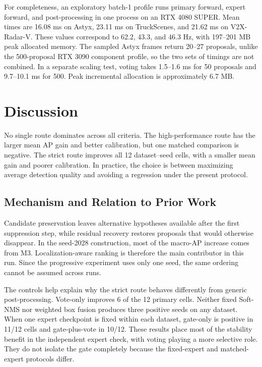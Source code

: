 \documentclass[sensors,article,submit,pdftex,moreauthors]{Definitions/mdpi}
\begin{document}
For completeness, an exploratory batch-1 profile runs primary forward, expert
forward, and post-processing in one process on an RTX 4080 SUPER. Mean times are 16.08 ms
on Astyx, 23.11 ms on TruckScenes, and 21.62 ms on V2X-Radar-V. These values
correspond to 62.2, 43.3, and 46.3 Hz, with 197--201 MB peak allocated memory.
The sampled Astyx frames return 20--27 proposals, unlike the 500-proposal
RTX 3090 component profile, so the two sets of timings are not combined. In a
separate scaling test, voting takes
1.5--1.6 ms for 50 proposals and 9.7--10.1 ms for 500. Peak incremental
allocation is approximately 6.7 MB.

\section{Discussion}

No single route dominates across all criteria. The high-performance route has
the larger mean AP gain and better calibration, but one matched comparison is
negative. The strict route improves all 12 dataset--seed cells, with a smaller
mean gain and poorer calibration. In practice, the choice is between maximizing
average detection quality and avoiding a regression under the present protocol.

\subsection{Mechanism and Relation to Prior Work}

Candidate preservation leaves alternative hypotheses available after the first
suppression step, while residual recovery restores proposals that would
otherwise disappear. In the seed-2028 construction, most of the macro-AP
increase comes from M3. Localization-aware ranking is therefore the main
contributor in this run. Since the progressive experiment uses only one seed,
the same ordering cannot be assumed across runs.

The controls help explain why the strict route behaves differently from generic
post-processing. Vote-only improves 6 of the 12 primary cells. Neither fixed
Soft-NMS nor weighted box fusion produces three positive seeds on any dataset.
When one expert checkpoint is fixed within each dataset, gate-only is positive
in 11/12 cells and gate-plus-vote in 10/12. These results place most of the
stability benefit in the independent expert check, with voting playing a more
selective role. They do not isolate the gate completely because the fixed-expert
and matched-expert protocols differ.
\end{document}
